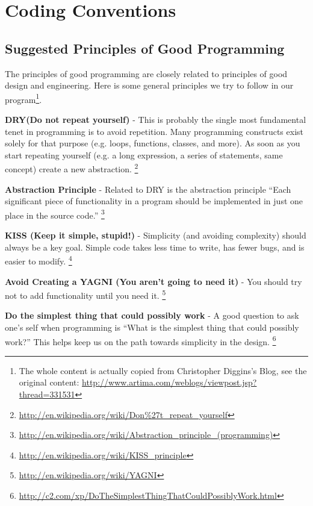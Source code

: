 %
%
\chapter{Coding Conventions}

\section{Suggested Principles of Good Programming}
\label{principle}

The principles of good programming are closely related to principles of good
design and engineering. Here is some general principles we try to follow in our
program\footnote{The whole content is actually copied from Christopher Diggins's
Blog, see the original content: 
\url{http://www.artima.com/weblogs/viewpost.jsp?thread=331531}}.

\textbf{DRY(Do not repeat yourself)} - This is probably the single most fundamental
tenet in programming is to avoid repetition. Many programming constructs exist
solely for that purpose (e.g. loops, functions, classes, and more). As soon as
you start repeating yourself (e.g. a long expression, a series of statements,
same concept) create a new abstraction.
\footnote{\url{http://en.wikipedia.org/wiki/Don\%27t_repeat_yourself}}

\textbf{Abstraction Principle} - Related to DRY is the abstraction principle ``Each
significant piece of functionality in a program should be implemented in just
one place in the source code.''
\footnote{\url{http://en.wikipedia.org/wiki/Abstraction_principle_(programming)}}

\textbf{KISS (Keep it simple, stupid!)} - Simplicity (and avoiding complexity) should
always be a key goal. Simple code takes less time to write, has fewer bugs, and
is easier to modify.
\footnote{\url{http://en.wikipedia.org/wiki/KISS_principle}}

\textbf{Avoid Creating a YAGNI (You aren’t going to need it)} - You should try not to
add functionality until you need it.
\footnote{\url{http://en.wikipedia.org/wiki/YAGNI}}

\textbf{Do the simplest thing that could possibly work} - A good question to ask one's
self when programming is ``What is the simplest thing that could possibly
work?'' This helps keep us on the path towards simplicity in the design.
\footnote{\url{http://c2.com/xp/DoTheSimplestThingThatCouldPossiblyWork.html}}

